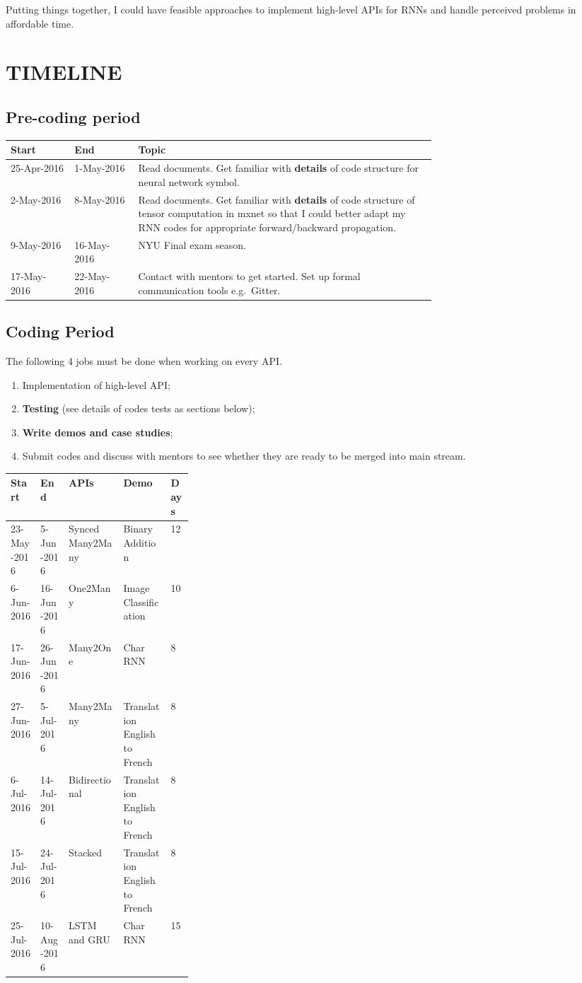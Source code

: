 \documentclass[]{article}
\providecommand{\tightlist}{%
  \setlength{\itemsep}{0pt}\setlength{\parskip}{0pt}}
\begin{document}
Putting things together, I could have feasible approaches to implement
high-level APIs for RNNs and handle perceived problems in affordable
time.

\section{TIMELINE}\label{timeline}

\subsection{Pre-coding period}\label{pre-coding-period}

\begin{longtable}[l]{ll p{0.7\linewidth}}
\toprule
Start & End & Topic\tabularnewline
\midrule
\endhead
25-Apr-2016 & 1-May-2016 & Read documents. Get familiar with
\textbf{details} of code structure for neural network
symbol.\tabularnewline
2-May-2016 & 8-May-2016 & Read documents. Get familiar with
\textbf{details} of code structure of tensor computation in mxnet so
that I could better adapt my RNN codes for appropriate forward/backward
propagation.\tabularnewline
9-May-2016 & 16-May-2016 & NYU Final exam season.\tabularnewline
17-May-2016 & 22-May-2016 & Contact with mentors to get started. Set up
formal communication tools e.g.~Gitter.\tabularnewline
\bottomrule
\end{longtable}

\subsection{Coding Period}\label{coding-period}

The following 4 jobs must be done when working on every API.

\begin{enumerate}
\def\labelenumi{\arabic{enumi}.}
\tightlist
\item
  Implementation of high-level API;
\item
  \textbf{Testing} (see details of codes tests as sections below);
\item
  \textbf{Write demos and case studies};
\item
  Submit codes and discuss with mentors to see whether they are ready to
  be merged into main stream.
\end{enumerate}

\begin{longtable}[c]{llp{0.3\linewidth}ll}
\toprule
Start & End & APIs & Demo & Days\tabularnewline
\midrule
\endhead
23-May-2016 & 5-Jun-2016 & Synced Many2Many & Binary Addition &
12\tabularnewline
6-Jun-2016 & 16-Jun-2016 & One2Many & Image Classification &
10\tabularnewline
17-Jun-2016 & 26-Jun-2016 & Many2One & Char RNN & 8\tabularnewline
27-Jun-2016 & 5-Jul-2016 & Many2Many & Translation English to French &
8\tabularnewline
6-Jul-2016 & 14-Jul-2016 & Bidirectional & Translation English to French
& 8\tabularnewline
15-Jul-2016 & 24-Jul-2016 & Stacked & Translation English to French &
8\tabularnewline
25-Jul-2016 & 10-Aug-2016 & LSTM and GRU & Char RNN & 15\tabularnewline
\bottomrule
\end{longtable}
\end{document}

